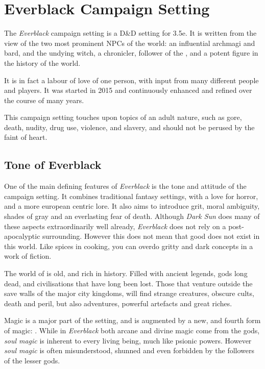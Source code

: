 \chapter{Everblack Campaign Setting}

The \emph{Everblack} campaign setting is a D\&D setting for 3.5e.  It is
written from the view of the two most prominent NPCs of the world:
 an influential archmagi and bard, and
 the undying witch, a chronicler, follower of the
, and a potent figure in the history of the
world.

It is in fact a labour of love of one person, with input from many different
people and players. It was started in 2015 and continuously enhanced and
refined over the course of many years.

This campaign setting touches upon topics of an adult nature, such as gore,
death, nudity, drug use, violence, and slavery, and should not be perused by
the faint of heart.

\section{Tone of Everblack}

One of the main defining features of \emph{Everblack} is the tone and attitude
of the campaign setting. It combines traditional fantasy settings, with a love
for horror, and a more european centric lore. It also aims to introduce grit,
moral ambiguity, shades of gray and an everlasting fear of death. Although
\emph{Dark Sun} does many of these aspects extraordinarily well already,
\emph{Everblack} does not rely on a post-apocalyptic surrounding. However this
does not mean that good does not exist in this world. Like spices in cooking,
you can overdo gritty and dark concepts in a work of fiction.

The world of  is old, and rich in history. Filled with
ancient legends, gods long dead, and civilisations that have long been lost.
Those that venture outside the save walls of the major city kingdoms, will
find strange creatures, obscure cults, death and peril, but also adventures,
powerful artefacts and great riches.

Magic is a major part of the setting, and is augmented by a new, and fourth
form of magic: . While in \emph{Everblack} both arcane
and divine magic come from the gods, \emph{soul magic} is inherent to every
living being, much like psionic powers. However \emph{soul magic} is often
misunderstood, shunned and even forbidden by the followers of the lesser gods.

